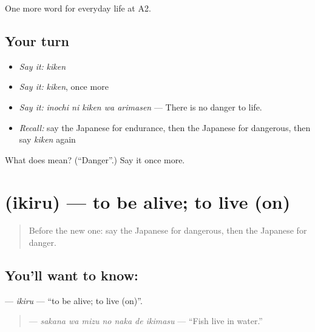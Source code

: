 \begin{grammarlens}[title={What you've built}]
One more word for everyday life at A2.
\end{grammarlens}

\subsection*{Your turn}
\begin{itemize}
\raggedright
  \item \emph{Say it:} \emph{kiken}
  \item \emph{Say it:} \emph{kiken}, once more
  \item \emph{Say it:} \emph{inochi ni kiken wa arimasen} — There is no danger to life.
  \item \emph{Recall:} say the Japanese for endurance, then the Japanese for dangerous, then say \emph{kiken} again
\end{itemize}

\begin{tcolorbox}[breakable,colback=teal!4,colframe=teal!35!black,title={Before you move on}]
What does  mean? (\textquotedblleft{}Danger\textquotedblright{}.) Say it once more.
\end{tcolorbox}
\section[\texorpdfstring{\ja{いきる} (ikiru)}{いきる (ikiru)}]{ (ikiru) — to be alive; to live (on)}

\label{lesson:JA-C223-ikiru}



\begin{quote}
Before the new one: say the Japanese for dangerous, then the Japanese for danger.
\end{quote}

\subsection*{You'll want to know: }
\textbf{} — \emph{ikiru} — \textquotedblleft{}to be alive; to live (on)\textquotedblright{}.

\begin{quote}
\textbf{   } — \emph{sakana wa mizu no naka de ikimasu} — \textquotedblleft{}Fish live in water.\textquotedblright{}
\end{quote}

